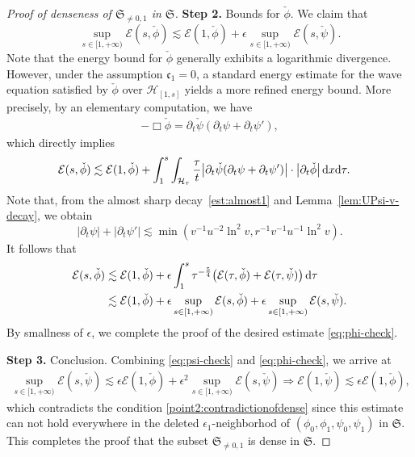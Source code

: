 \documentclass[a4paper,reqno]{amsart}
\theoremstyle{definition}
\numberwithin{equation}{section}
\def \d {{\rm{d}}}
\def\ep{\epsilon}
\def\Sfrak{\mathfrak{S}}
\begin{document}
\begin{proof}[Proof of denseness of $\Sfrak_{\neq 0, 1}$ in $\Sfrak$]
\smallskip
\textbf{Step 2.} Bounds for $\check{\phi}$.
We claim that 
\begin{equation}\label{eq:phi-check}
    \sup_{s\in [1, +\infty)} \mathcal{E}(s, \check{\phi})
    \lesssim
    \mathcal{E}(1, \check{\phi})
    +
    \epsilon \sup_{s\in [1, +\infty)} \mathcal{E}(s, \check{\psi}).
\end{equation}
Note that the energy bound for $\check{\phi}$ generally exhibits a logarithmic divergence. However, under the assumption $\mathfrak{c}_{1} = 0$, a standard energy estimate for the wave equation satisfied by $\check{\phi}$ over $\mathcal{H}_{[1,s]}$ yields a more refined energy bound. More precisely, by an elementary computation, we have 
\begin{align*}
    -\Box \check{\phi}
    =
    \partial_t \check{\psi} (\partial_t \psi + \partial_t \psi'),
\end{align*} 
which directly implies
\begin{align*}
    \mathcal{E}(s, \check{\phi})
    \lesssim{}
    &\mathcal{E}(1, \check{\phi})
    +
    \int_1^s \int_{\mathcal{H}_\tau} {\tau\over t}\big| \partial_t \check{\psi} (\partial_t \psi + \partial_t \psi') \big| \cdot \big| \partial_t \check{\phi}  \big| \, \d x \d\tau.
\end{align*}
Note that, from the almost sharp decay~\eqref{est:almost1} and Lemma~\ref{lem:UPsi-v-decay}, we obtain
\begin{equation*}
    |\partial_t \psi |
    +|\partial_t \psi' |
    \lesssim \min \left(v^{-1}u^{-2}\ln^{2}v,r^{-1}v^{-1}u^{-1}\ln^{2}v\right).
\end{equation*}
It follows that 
\begin{align*}
    \mathcal{E}(s, \check{\phi})
    &\lesssim
    \mathcal{E}(1, \check{\phi})
    +
    \ep\int_1^s \tau^{-{5\over 4}} \big( \mathcal{E}(\tau, \check{\phi}) + \mathcal{E}(\tau, \check{\psi})\big) \, \d\tau\\
    &\lesssim
    \mathcal{E}(1, \check{\phi})
    +
    \epsilon \sup_{s\in [1, +\infty)}\mathcal{E}(s, \check{\phi}) +  \epsilon \sup_{s\in [1, +\infty)}\mathcal{E}(s, \check{\psi}).
\end{align*}
By smallness of $\epsilon$, we complete the proof of the desired estimate \eqref{eq:phi-check}.

\smallskip
\textbf{Step 3.} Conclusion. Combining \eqref{eq:psi-check} and \eqref{eq:phi-check}, we arrive at
\begin{align*}
    \sup_{s\in [1, +\infty)} \mathcal{E}(s, \check{\psi})
    \lesssim
    \epsilon \mathcal{E}(1, \check{\phi})
    +
    \epsilon^2 \sup_{s\in [1, +\infty)} \mathcal{E}(s, \check{\psi})\Longrightarrow \mathcal{E}(1, \check{\psi})
    \lesssim
    \epsilon \mathcal{E}(1, \check{\phi}),
\end{align*}
which contradicts the condition \ref{point2:contradictionofdense} since this estimate can not hold everywhere in the deleted $\epsilon_1$-neighborhod of $(\phi_0, \phi_1, \psi_0, \psi_1)$ in $\Sfrak$. This completes the proof that the subset $\Sfrak_{\neq 0, 1}$ is dense in $\Sfrak$.
\end{proof}
\end{document}
